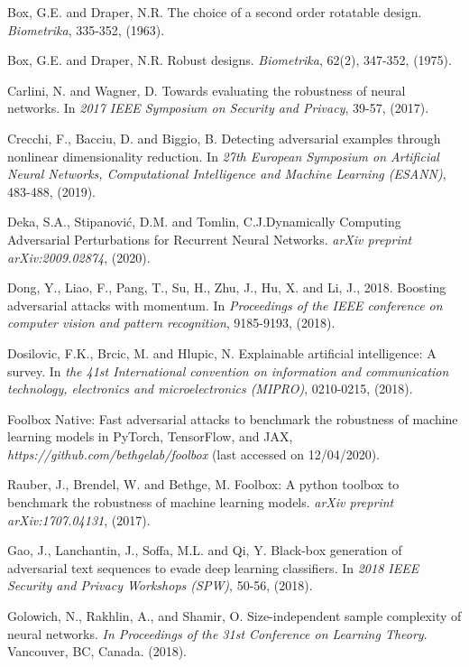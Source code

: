 \documentclass[12pt]{article}
\begin{document}
\begin{thebibliography}{}
  Box, G.E. and Draper, N.R. The choice of a second order
  rotatable design. {\it Biometrika}, 335-352, (1963).

  Box, G.E. and Draper, N.R. Robust designs. {\it Biometrika}, 62(2),
  347-352, (1975).

Carlini, N. and Wagner, D. Towards evaluating the robustness of neural
networks. In {\it 2017 IEEE Symposium on Security and Privacy}, 39-57, (2017).  
  
Crecchi, F., Bacciu, D. and Biggio, B. Detecting adversarial examples
through nonlinear dimensionality reduction. In {\it 27th European Symposium
on Artificial Neural Networks, Computational Intelligence and Machine
Learning (ESANN)}, 483-488, (2019). 
  
Deka, S.A., Stipanović, D.M. and Tomlin, C.J.Dynamically Computing
Adversarial Perturbations for Recurrent Neural Networks. {\it arXiv
  preprint arXiv:2009.02874}, (2020).  

Dong, Y., Liao, F., Pang, T., Su, H., Zhu, J., Hu, X. and Li, J.,
2018. Boosting adversarial attacks with momentum. In {\it Proceedings of
the IEEE conference on computer vision and pattern recognition},
9185-9193, (2018).

Dosilovic, F.K., Brcic, M. and Hlupic, N. Explainable artificial
intelligence: A survey. In {\it the 41st International convention on
information and communication technology, electronics and
microelectronics (MIPRO)}, 0210-0215, (2018).
 

Foolbox Native: Fast adversarial attacks to benchmark the robustness
of machine learning models in PyTorch, TensorFlow, and JAX, {\it
  https://github.com/bethgelab/foolbox} (last accessed on 12/04/2020). 

 Rauber, J., Brendel, W. and Bethge, M. Foolbox: A python toolbox to
 benchmark the robustness of machine learning models. {\it arXiv preprint
 arXiv:1707.04131}, (2017). 

Gao, J., Lanchantin, J., Soffa, M.L. and Qi, Y. Black-box generation
of adversarial text sequences to evade deep learning classifiers. In
{\it 2018 IEEE Security and Privacy Workshops (SPW)}, 50-56, (2018). 

Golowich, N., Rakhlin, A., and Shamir, O.  Size-independent sample
complexity of neural networks. {\it In Proceedings of the 31st
  Conference on Learning Theory}. Vancouver, BC, Canada. (2018).


\end{thebibliography}
\end{document}
